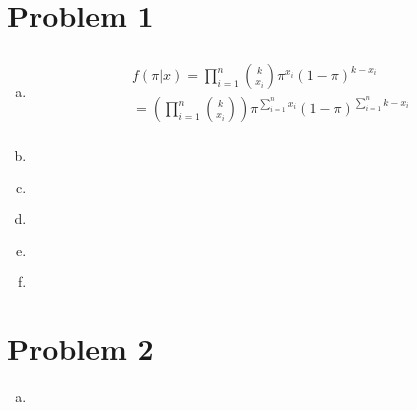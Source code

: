 \documentclass{article}
\newcommand{\sumn}{\sum_{i=1}^{n}}
\newcommand{\prodn}{\prod_{i=1}^{n}}
\newcommand{\sumx}{\sum_{i=1}^{n}x_i}
\begin{document}
\begin{flushleft}

	\section*{Problem 1}
	
\begin{enumerate}[(a)]
	
	\item 
\begin{multline*}\\
f(\pi|x)=\prodn {k \choose x_i} \pi^{x_i}  (1-\pi)^{k-x_i}\\
=\left(\prodn {k \choose x_i} \right) \pi^{\sumx} (1-\pi)^{\sumn k-x_i}\\
\end{multline*}

	\item 
\begin{multline*}\\
\end{multline*}

	\item 
\begin{multline*}\\
\end{multline*}

\item 
\begin{multline*}\\
\end{multline*}

	\item 
\begin{multline*}\\
\end{multline*}

	\item 
\begin{multline*}\\
\end{multline*}

\end{enumerate}

	\section*{Problem 2}
\begin{enumerate}[(a)]
	
	\item 
\begin{multline*}\\
\end{multline*}


\end{enumerate}
\end{flushleft}
\end{document}
